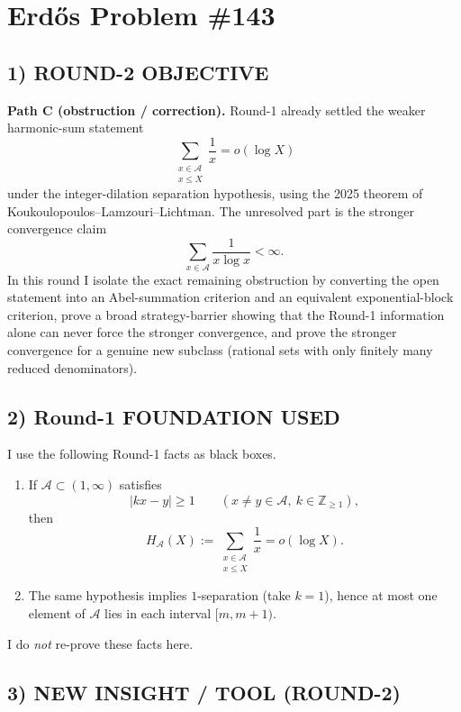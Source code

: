 
\section*{Erd\H{o}s Problem \#143}

\subsection*{1) ROUND-2 OBJECTIVE}

\textbf{Path C (obstruction / correction).} Round-1 already settled the weaker harmonic-sum statement
\[
\sum_{\substack{x\in \mathcal A\\ x\le X}}\frac1x=o(\log X)
\]
under the integer-dilation separation hypothesis, using the 2025 theorem of
Koukoulopoulos--Lamzouri--Lichtman. The unresolved part is the stronger convergence claim
\[
\sum_{x\in\mathcal A}\frac{1}{x\log x}<\infty.
\]
In this round I isolate the exact remaining obstruction by converting the open statement into an
Abel-summation criterion and an equivalent exponential-block criterion, prove a broad strategy-barrier
showing that the Round-1 information alone can never force the stronger convergence, and prove the
stronger convergence for a genuine new subclass (rational sets with only finitely many reduced denominators).

\subsection*{2) Round-1 FOUNDATION USED}

I use the following Round-1 facts as black boxes.

\begin{enumerate}
\item If $\mathcal A\subset (1,\infty)$ satisfies
\[
|kx-y|\ge 1 \qquad (x\neq y\in\mathcal A,\ k\in\mathbb Z_{\ge 1}),
\]
then
\[
H_{\mathcal A}(X):=\sum_{\substack{x\in\mathcal A\\ x\le X}}\frac1x=o(\log X).
\]
\item The same hypothesis implies $1$-separation (take $k=1$), hence at most one element of
$\mathcal A$ lies in each interval $[m,m+1)$.
\end{enumerate}

I do \emph{not} re-prove these facts here.

\subsection*{3) NEW INSIGHT / TOOL (ROUND-2)}

